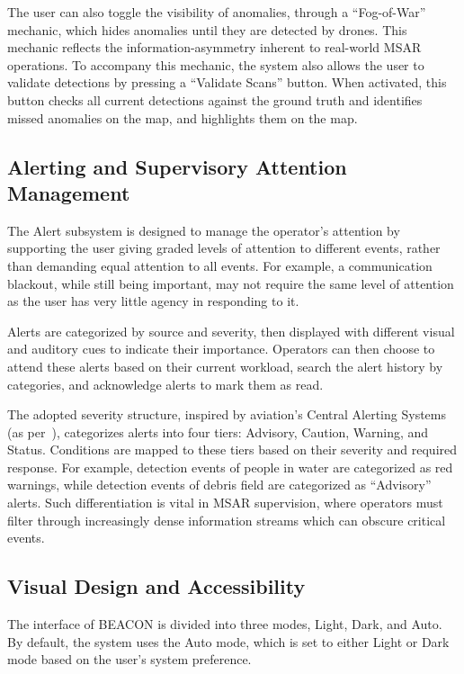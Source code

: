 The user can also toggle the visibility of anomalies, through a ``Fog-of-War'' mechanic, which hides anomalies until they are detected by drones.
This mechanic reflects the information-asymmetry inherent to real-world MSAR operations.
To accompany this mechanic, the system also allows the user to validate detections by pressing a ``Validate Scans'' button.
When activated, this button checks all current detections against the ground truth and identifies missed anomalies on the map, and highlights them on the map.

\subsection{Alerting and Supervisory Attention Management}\label{subsec:alerting-and-supervisory-attention-management}

The Alert subsystem is designed to manage the operator's attention by supporting the user giving graded levels of attention to different events, rather than demanding equal attention to all events.
For example, a communication blackout, while still being important, may not require the same level of attention as the user has very little agency in responding to it.

Alerts are categorized by source and severity, then displayed with different visual and auditory cues to indicate their importance.
Operators can then choose to attend these alerts based on their current workload, search the alert history by categories, and acknowledge alerts to mark them as read.

The adopted severity structure, inspired by aviation's Central Alerting Systems (as per~\cite{RN3}), categorizes alerts into four tiers: Advisory, Caution, Warning, and Status.
Conditions are mapped to these tiers based on their severity and required response.
For example, detection events of people in water are categorized as red warnings, while detection events of debris field are categorized as ``Advisory'' alerts.
Such differentiation is vital in MSAR supervision, where operators must filter through increasingly dense information streams which can obscure critical events.

\subsection{Visual Design and Accessibility}\label{subsec:visual-design-and-accessibility}

The interface of BEACON is divided into three modes, Light, Dark, and Auto.
By default, the system uses the Auto mode, which is set to either Light or Dark mode based on the user's system preference.

